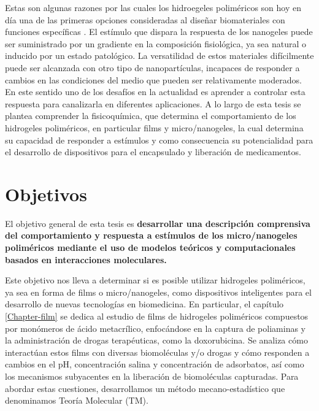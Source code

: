 Estas son algunas razones por las cuales los hidroegeles polim\'ericos son hoy en d\'ia una de las primeras opciones consideradas al dise\~nar biomateriales con funciones espec\'ificas \cite{soni2016nanogels,sabir2019polymeric}. El est\'imulo que dispara la respuesta de los nanogeles puede ser suministrado por un gradiente en la composici\'on fisiol\'ogica, ya sea natural o inducido por un estado patol\'ogico. La versatilidad de estos materiales dif\'icilmente puede ser alcanzada con otro tipo de nanopart\'iculas, incapaces de responder a cambios en las condiciones del medio que pueden ser relativamente moderados.
En este sentido uno de los desaf\'ios en la actualidad es aprender a controlar esta respuesta para canalizarla en diferentes aplicaciones. A lo largo de esta tesis se plantea comprender la fisicoqu\'imica, que determina el comportamiento de los hidrogeles polim\'ericos, en particular  films y micro/nanogeles, la cual determina su capacidad de responder a est\'imulos y como consecuencia su potencialidad para el desarrollo de dispositivos para el encapsulado y liberaci\'on de medicamentos.







\section{Objetivos}

El objetivo general de esta tesis es \textbf{desarrollar una descripci\'on comprensiva del comportamiento y respuesta a est\'imulos de los micro/nanogeles polim\'ericos mediante el uso de modelos te\'oricos y computacionales basados en interacciones moleculares.}

Este objetivo nos lleva a determinar si es posible utilizar hidrogeles polim\'ericos, ya sea en forma de films o micro/nanogeles, como dispositivos inteligentes para el desarrollo de nuevas tecnolog\'ias en biomedicina. En particular, el cap\'itulo \ref{Chapter-film} se dedica al estudio de films de hidrogeles polim\'ericos compuestos por mon\'omeros de \'acido metacr\'ilico, enfoc\'andose en la captura de poliaminas y la administraci\'on de drogas terap\'euticas, como la doxorubicina. Se analiza c\'omo interact\'uan estos films con diversas biomol\'eculas y/o drogas y c\'omo responden a cambios en el pH, concentraci\'on salina y concentraci\'on de adsorbatos, as\'i como los mecanismos subyacentes en la liberaci\'on de biomol\'eculas capturadas.
Para abordar estas cuestiones, desarrollamos un m\'etodo mecano-estad\'istico que denominamos Teor\'ia Molecular (TM).


